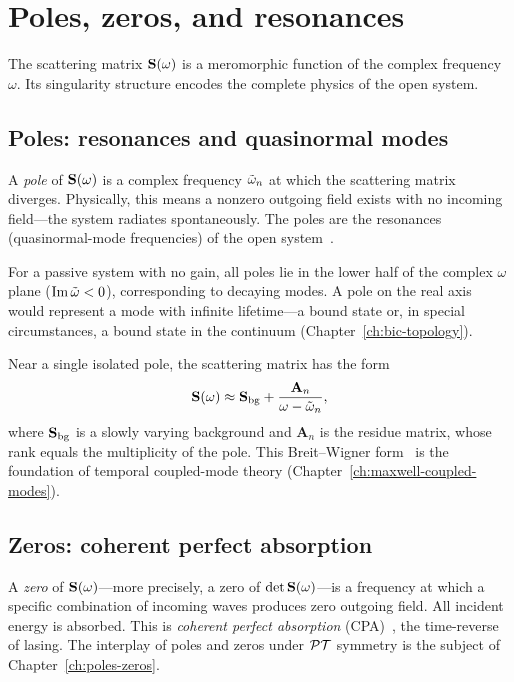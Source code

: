 \section{Poles, zeros, and resonances}
\label{sec:poles-zeros-ch4}

The scattering matrix $\mathbf{S}(\omega)$ is a meromorphic function of the
complex frequency $\omega$. Its singularity structure encodes the
complete physics of the open system.

\subsection{Poles: resonances and quasinormal modes}
\label{ssec:poles}

A \emph{pole} of $\mathbf{S}(\omega)$ is a complex frequency $\tilde{\omega}_n$ at
which the scattering matrix diverges. Physically, this means a nonzero
outgoing field exists with no incoming field---the system radiates
spontaneously. The poles are the resonances (quasinormal-mode
frequencies) of the open system~\cite{vial2014quasimodal}.

For a passive system with no gain, all poles lie in the lower half of
the complex $\omega$ plane ($\operatorname{Im}\tilde{\omega} < 0$), corresponding to decaying
modes. A pole on the real axis would represent a mode with infinite
lifetime---a bound state or, in special circumstances, a bound state in
the continuum (Chapter~\ref{ch:bic-topology}).

Near a single isolated pole, the scattering matrix has the form
\begin{equation}
 \mathbf{S}(\omega) \approx \mathbf{S}_{\mathrm{bg}}
 + \frac{\mathbf{A}_n}{\omega - \tilde{\omega}_n},
 \label{eq:pole-expansion}
\end{equation}
where $\mathbf{S}_{\mathrm{bg}}$ is a slowly varying background and
$\mathbf{A}_n$ is the residue matrix, whose rank equals the multiplicity
of the pole. This Breit--Wigner form~\cite{alpeggiani2017quasinormal,sauvan2014modal,lasson2014roundtrip} is the foundation of temporal
coupled-mode theory (Chapter~\ref{ch:maxwell-coupled-modes}).

\subsection{Zeros: coherent perfect absorption}
\label{ssec:zeros}

A \emph{zero} of $\mathbf{S}(\omega)$---more precisely, a zero of
$\det\mathbf{S}(\omega)$---is a frequency at which a specific combination of
incoming waves produces zero outgoing field. All incident energy is
absorbed. This is \emph{coherent perfect absorption} (CPA)~\cite{sweeney2019perfectly,wang2021coherent}, the
time-reverse of lasing. The interplay of poles and zeros under
$\mathcal{PT}$ symmetry is the subject of Chapter~\ref{ch:poles-zeros}.

